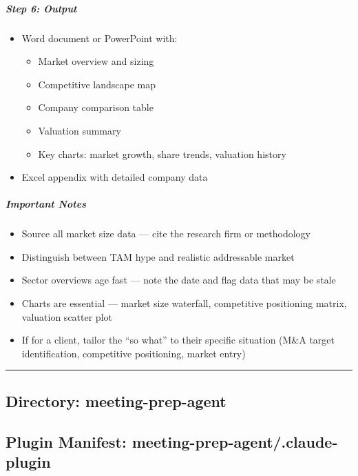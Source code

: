 \documentclass[11pt]{article}
\begin{document}
\subparagraph{Step 6: Output}\mbox{}\par

\begin{itemize}[leftmargin=*,itemsep=2pt,topsep=2pt]
\item {} Word document or PowerPoint with:
\begin{itemize}[leftmargin=*,itemsep=2pt,topsep=2pt]
\item {} Market overview and sizing
\item {} Competitive landscape map
\item {} Company comparison table
\item {} Valuation summary
\item {} Key charts: market growth, share trends, valuation history
\end{itemize}
\item {} Excel appendix with detailed company data
\end{itemize}

\subparagraph{Important Notes}\mbox{}\par

\begin{itemize}[leftmargin=*,itemsep=2pt,topsep=2pt]
\item {} Source all market size data — cite the research firm or methodology
\item {} Distinguish between TAM hype and realistic addressable market
\item {} Sector overviews age fast — note the date and flag data that may be stale
\item {} Charts are essential — market size waterfall, competitive positioning matrix, valuation scatter plot
\item {} If for a client, tailor the ``so what'' to their specific situation (M\&A target identification, competitive positioning, market entry)
\end{itemize}

\vspace{0.8em}\hrule\vspace{0.8em}

\subsection{Directory: meeting-prep-agent}

\subsection{Plugin Manifest: meeting-prep-agent/.claude-plugin}\label{file:meeting-prep-agent-claude-plugin-plugin-json}
\end{document}
